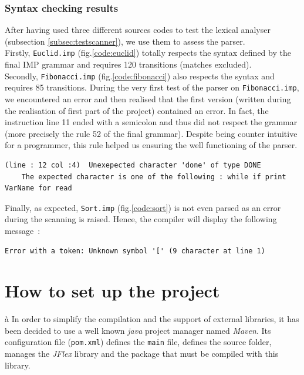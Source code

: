\documentclass[a4paper,11pt]{article}
\begin{document}
    \subsubsection{Syntax checking results}  
      After having used three different sources codes to test the lexical analyser (subsection \ref{subsec:testscanner}), we use them to assess the parser.\\
      Firstly, \verb|Euclid.imp| (fig.\ref{code:euclid}) totally respects the syntax defined by the final IMP grammar and requires 120 transitions (matches excluded).\\ %
      Secondly, \verb|Fibonacci.imp| (fig.\ref{code:fibonacci}) also respects the syntax and requires 85 transitions. During the very first test of the parser on \verb|Fibonacci.imp|, we encountered an error and then realised that the first version (written during the realisation of first part of the project) contained an error. In fact, the instruction line 11 ended with a semicolon and thus did not respect the grammar (more precisely the rule 52 of the final grammar). Despite being counter intuitive for a programmer, this rule helped us ensuring the well functioning of the parser.
        \begin{verbatim}
(line : 12 col :4)	Unexepected character 'done' of type DONE
    The expected character is one of the following : while if print VarName for read
        \end{verbatim}
    Finally, as expected, \verb|Sort.imp| (fig.\ref{code:sort}) is not even parsed as an error during the scanning is raised. Hence, the compiler will display the following message~:
      \begin{verbatim}
Error with a token: Unknown symbol '[' (9 character at line 1)
      \end{verbatim}

\section{How to set up the project}à
  In order to simplify the compilation and the support of external libraries, it has been decided to use a well known \textit{java} project manager named \textit{Maven}. Its configuration file (\verb|pom.xml|) defines the \verb|main| file, defines the source folder, manages the \textit{JFlex} library and the package that must be compiled with this library.
\end{document}

